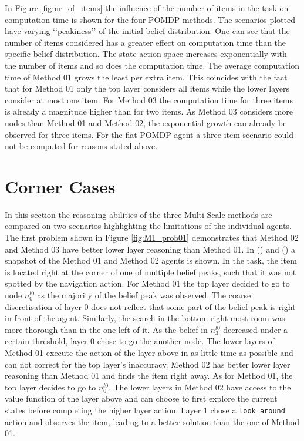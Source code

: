 In Figure \ref{fig:nr_of_items} the influence of the number of items in the task on computation time is shown for the four POMDP methods. The scenarios plotted have varying ‘‘peakiness’’ of the initial belief distribution. One can see that the number of items considered has a greater effect on computation time than the specific belief distribution. The state-action space increases exponentially with the number of items and so does the computation time. The average computation time of Method 01 grows the least per extra item. This coincides with the fact that for Method 01 only the top layer considers all items while the lower layers consider at most one item. For Method 03 the computation time for three items is already a magnitude higher than for two items. As Method 03 considers more nodes than Method 01 and Method 02, the exponential growth can already be observed for three items. For the flat POMDP agent a three item scenario could not be computed for reasons stated above.

\section{Corner Cases}\label{sec:cornercases}
In this section the reasoning abilities of the three Multi-Scale methods are compared on two scenarios highlighting the limitations of the individual agents. The first problem shown in Figure \ref{fig:M1_prob01} demonstrates that Method 02 and Method 03 have better lower layer reasoning than Method 01. In () and () a snapshot of the Method 01 and Method 02 agents is shown. In the task, the item is located right at the corner of one of multiple belief peaks, such that it was not spotted by the navigation action. For Method 01 the top layer decided to go to node $n_0^{l0}$ as the majority of the belief peak was observed. The coarse discretisation of layer 0 does not reflect that some part of the belief peak is right in front of the agent. Similarly, the search in the bottom right-most room was more thorough than in the one left of it. As the belief in $n_3^{l0}$ decreased under a certain threshold, layer 0 chose to go the another node. The lower layers of Method 01 execute the action of the layer above in as little time as possible and can not correct for the top layer's inaccuracy.
Method 02 has better lower layer reasoning than Method 01 and finds the item right away. As for Method 01, the top layer decides to go to $n_0^{l0}$. The lower layers in Method 02 have access to the value function of the layer above and can choose to first explore the current states before completing the higher layer action. Layer 1 chose a \texttt{look\_around} action and observes the item, leading to a better solution than the one of Method 01. \\

